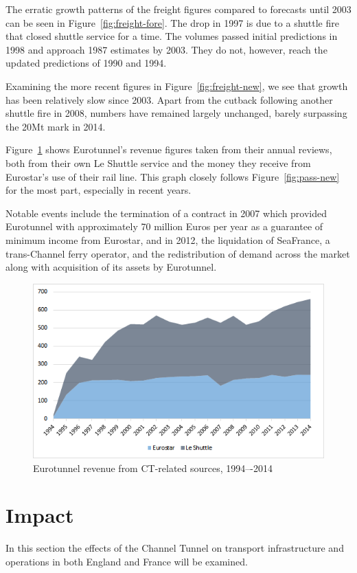 \documentclass[12pt]{article} %
\begin{document}
The erratic growth patterns of the freight figures compared to forecasts until 2003 can be seen in Figure~\ref{fig:freight-fore}. The drop in 1997 is due to a shuttle fire that closed shuttle service for a time. The volumes passed initial predictions in 1998 and approach 1987 estimates by 2003. They do not, however, reach the updated predictions of 1990 and 1994.

Examining the more recent figures in Figure~\ref{fig:freight-new}, we see that growth has been relatively slow since 2003. Apart from the cutback following another shuttle fire in 2008, numbers have remained largely unchanged, barely surpassing the 20Mt mark in 2014.

Figure~\ref{fig:revenue} shows Eurotunnel's revenue figures taken from their annual reviews\cite{et-reports}, both from their own Le Shuttle service and the money they receive from Eurostar's use of their rail line. This graph closely follows Figure~\ref{fig:pass-new} for the most part, especially in recent years. 

Notable events include the termination of a contract in 2007 which provided Eurotunnel with approximately 70 million Euros per year as a guarantee of minimum income from Eurostar, and in 2012, the liquidation of SeaFrance, a trans-Channel ferry operator, and the redistribution of demand across the market along with acquisition of its assets by Eurotunnel.\cite{et-reports}

\begin{figure}[htp]
  \centering
  \includegraphics[width=\textwidth]{revenue}
  \caption{Eurotunnel revenue from CT-related sources, 1994–-2014}
  \label{fig:revenue}
\end{figure}

\section{Impact}
In this section the effects of the Channel Tunnel on transport infrastructure and operations in both England and France will be examined.
\end{document}
